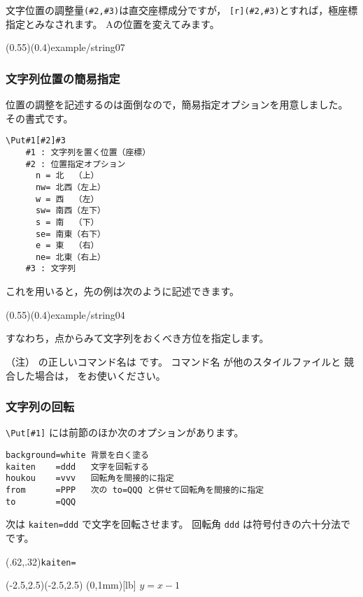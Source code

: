 文字位置の調整量\verb/(#2,#3)/は直交座標成分ですが，
\verb/[r](#2,#3)/とすれば，極座標指定とみなされます。
Aの位置を変えてみます。

\showexample[調整量を極座標指定](0.55)(0.4){example/string07}

\subsubsection{文字列位置の簡易指定}
位置の調整を記述するのは面倒なので，簡易指定オプションを用意しました。
その書式です。

\begin{boxnote}
\begin{verbatim}
\Put#1[#2]#3
    #1 : 文字列を置く位置（座標）
    #2 : 位置指定オプション
      n = 北  （上）
      nw= 北西（左上）
      w = 西  （左）
      sw= 南西（左下）
      s = 南  （下）
      se= 南東（右下）
      e = 東  （右）
      ne= 北東（右上）
    #3 : 文字列
\end{verbatim}
\end{boxnote}

これを用いると，先の例は次のように記述できます。

\showexample[位置の簡易指定オプション](0.55)(0.4){example/string04}

すなわち，点からみて文字列をおくべき方位を指定します。

（注） の正しいコマンド名は  です。
コマンド名 が他のスタイルファイルと
競合した場合は， をお使いください。

\subsubsection{文字列の回転}
\verb/\Put[#1]/ には前節のほか次のオプションがあります。
\begin{boxnote}
\begin{verbatim}
background=white 背景を白く塗る
kaiten    =ddd   文字を回転する
houkou    =vvv   回転角を間接的に指定
from      =PPP   次の to=QQQ と併せて回転角を間接的に指定
to        =QQQ
\end{verbatim}
\end{boxnote}

次は \texttt{kaiten=ddd} で文字を回転させます。
回転角 \texttt{ddd} は符号付きの六十分法でです。

\begin{showEx}(.62,.32){\texttt{kaiten=}}
\footnotesize
\begin{zahyou}(-2.5,2.5)(-2.5,2.5)
\Put{}
\Put{}
\Tyokusen\A\B{}{}
\Put[kaiten=45]\B(0,1mm)[lb]{%
$y=x-1$}
\end{zahyou}
\end{showEx}


